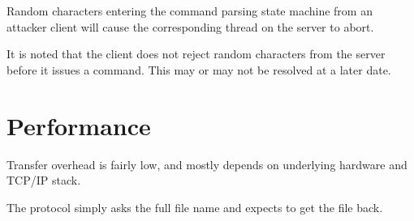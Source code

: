 \documentclass[12pt]{article}
\begin{document}
Random characters entering the command parsing state machine from an attacker
client will cause the corresponding thread on the server to abort.

It is noted that the client does not reject random characters from the server
before it issues a command.  This may or may not be resolved at a later date.

\section{Performance}
\label{sec:Performance}
Transfer overhead is fairly low, and mostly depends on underlying hardware and
TCP/IP stack.

The protocol simply asks the full file name and expects to get the file back.
\end{document}
